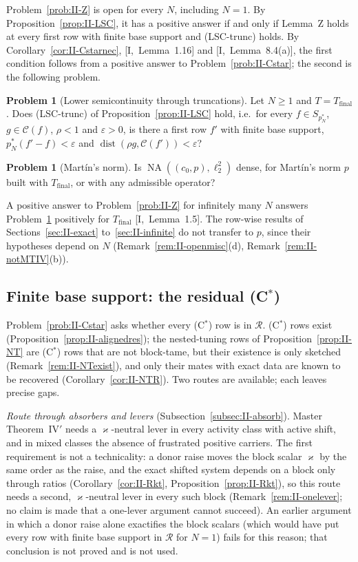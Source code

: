 \documentclass[10pt]{amsart}
\theoremstyle{definition}
\newtheorem{problem}[theorem]{Problem}
\theoremstyle{remark}
\newcommand{\NA}{\operatorname{NA}}
\newcommand{\dist}{\operatorname{dist}}
\newcommand{\Cset}{\mathcal C}
\newcommand{\Rec}{\mathcal R}
\begin{document}
Problem~\ref{prob:II-Z} is open for every $N$, including $N=1$.  By
Proposition~\ref{prop:II-LSC}, it has a positive answer if and only if
Lemma~Z holds at every first row with finite base support and
(LSC-trunc) holds.  By Corollary~\ref{cor:II-Cstarnec}, [I,~Lemma~1.16] and
[I,~Lemma~8.4(a)], the first condition follows from a positive answer to
Problem~\ref{prob:II-Cstar}; the second is the following problem.

\begin{problem}[Lower semicontinuity through truncations]\label{prob:II-LSC}
Let $N\ge1$ and $T=T_{\mathrm{final}}$.  Does \textup{(LSC-trunc)} of
Proposition~\textup{\ref{prop:II-LSC}} hold, i.e.\ for every $f\in
S_{p_N^*}$, $g\in\Cset(f)$, $\rho<1$ and $\varepsilon>0$, is there a first
row $f'$ with finite base support, $p_N^*(f'-f)<\varepsilon$ and
$\dist(\rho g,\Cset(f'))<\varepsilon$?
\end{problem}

\begin{problem}[Mart\'in's norm]\label{prob:II-p}
Is $\NA((c_0,p),\ell_2^2)$ dense, for Mart\'in's norm $p$ built with
$T_{\mathrm{final}}$, or with any admissible operator?
\end{problem}

A positive answer to Problem~\ref{prob:II-Z} for infinitely many $N$
answers Problem~\ref{prob:II-p} positively for $T_{\mathrm{final}}$
[I,~Lemma~1.5].  The row-wise results of Sections~\ref{sec:II-exact}
to~\ref{sec:II-infinite} do not transfer to $p$, since their hypotheses
depend on $N$ (Remark~\ref{rem:II-openmisc}(d),
Remark~\ref{rem:II-notMTIV}(b)).

\subsection{Finite base support: the residual (C$^*$)}
Problem~\ref{prob:II-Cstar} asks whether every (C$^*$) row is in $\Rec$.
(C$^*$) rows exist (Proposition~\ref{prop:II-alignedres}); the
nested-tuning rows of Proposition~\ref{prop:II-NT} are (C$^*$) rows that are
not block-tame, but their existence is only sketched
(Remark~\ref{rem:II-NTexist}), and only their mates with exact data are
known to be recovered (Corollary~\ref{cor:II-NTR}).  Two routes are
available; each leaves precise gaps.

\emph{Route through absorbers and levers} (Subsection~\ref{subsec:II-absorb}).
Master Theorem~IV$'$ needs a $\varkappa$-neutral lever in every activity
class with active shift, and in mixed classes the absence of frustrated
positive carriers.  The first requirement is not a technicality: a donor
raise moves the block scalar $\varkappa$ by the same order as the raise,
and the exact shifted system depends on a block only through ratios
(Corollary~\ref{cor:II-Rkt}, Proposition~\ref{prop:II-Rkt}), so this route
needs a second, $\varkappa$-neutral lever in every such block
(Remark~\ref{rem:II-onelever}; no claim is made that a one-lever argument
cannot succeed).  An earlier argument in which a donor
raise alone exactifies the block scalars (which would have put every row
with finite base support in $\Rec$ for $N=1$) fails for this reason; that
conclusion is not proved and is not used.
\end{document}
